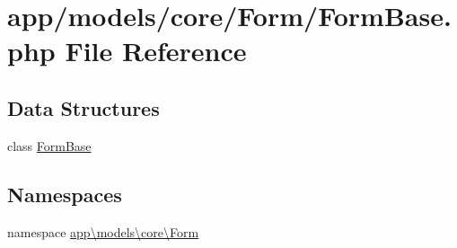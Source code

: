 \hypertarget{_form_base_8php}{\section{app/models/core/\-Form/\-Form\-Base.php File Reference}
\label{_form_base_8php}
}
\subsection*{Data Structures}
\begin{DoxyCompactItemize}
\item 
class \hyperlink{classapp_1_1models_1_1core_1_1_form_1_1_form_base}{Form\-Base}
\end{DoxyCompactItemize}
\subsection*{Namespaces}
\begin{DoxyCompactItemize}
\item 
namespace \hyperlink{namespaceapp_1_1models_1_1core_1_1_form}{app\textbackslash{}models\textbackslash{}core\textbackslash{}\-Form}
\end{DoxyCompactItemize}
